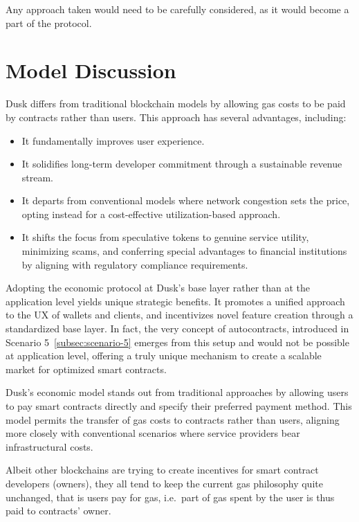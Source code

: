 \documentclass[twocolumn, nofootinbib]{revtex4-2} %
\begin{document}
    Any approach taken would need to be carefully considered, as it would
    become a part of the protocol.

    \section*{Model Discussion}\label{sec:discussion}
    Dusk differs from traditional blockchain models by allowing gas costs to be
    paid by contracts rather than users.
    This approach has several advantages, including:

    \begin{itemize}
        \item It fundamentally improves user experience.
        \item It solidifies long-term developer commitment through a sustainable
              revenue stream.
        \item It departs from conventional models where network congestion sets
              the price, opting instead for a cost-effective utilization-based
              approach.
        \item It shifts the focus from speculative tokens to genuine service
              utility, minimizing scams, and conferring special advantages to
              financial institutions by aligning with regulatory compliance
              requirements.
    \end{itemize}

    Adopting the economic protocol at Dusk's base layer rather than at the
    application level yields unique strategic benefits.
    It promotes a unified approach to the UX of wallets and clients, and
    incentivizes novel feature creation through a standardized base layer.
    In fact, the very concept of autocontracts, introduced in Scenario 5~\ref{subsec:scenario-5}
    emerges from this setup and would not be possible at application level,
    offering a truly unique mechanism to create a scalable market for optimized
    smart contracts.

    Dusk's economic model stands out from traditional approaches by allowing
    users to pay smart contracts directly and specify their preferred payment
    method.
    This model permits the transfer of gas costs to contracts rather than users,
    aligning more closely with conventional scenarios where service providers
    bear infrastructural costs.

    Albeit other blockchains are trying to create incentives for smart contract
    developers (owners), they all tend to keep the current gas philosophy quite
    unchanged, that is users pay for gas, i.e.\ part of gas spent by the user is
    thus paid to contracts' owner.\\
\end{document}
